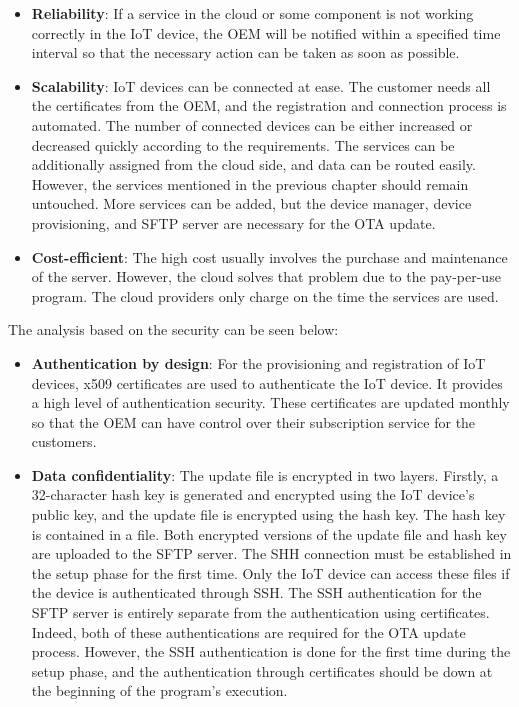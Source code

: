 \documentclass[12pt,a4paper]{article}
\begin{document}
{\begin{itemize}
\item \textbf{Reliability}: If a service in the cloud or some component is not working correctly in the IoT device, the OEM will be notified within a specified time interval so that the necessary action can be taken as soon as possible. 

\item \textbf{Scalability}: IoT devices can be connected at ease. The customer needs all the certificates from the OEM, and the registration and connection process is automated. The number of connected devices can be either increased or decreased quickly according to the requirements. The services can be additionally assigned from the cloud side, and data can be routed easily. However, the services mentioned in the previous chapter should remain untouched. More services can be added, but the device manager, device provisioning, and SFTP server are necessary for the OTA update.

\item \textbf{Cost-efficient}: The high cost usually involves the purchase and maintenance of the server. However, the cloud solves that problem due to the pay-per-use program. The cloud providers only charge on the time the services are used.

\end{itemize}

The analysis based on the security can be seen below:

\begin{itemize}

\item \textbf{Authentication by design}: For the provisioning and registration of IoT devices, x509 certificates are used to authenticate the IoT device. It provides a high level of authentication security. These certificates are updated monthly so that the OEM can have control over their subscription service for the customers.

\item \textbf{Data confidentiality}: The update file is encrypted in two layers. Firstly, a 32-character hash key is generated and encrypted using the IoT device's public key, and the update file is encrypted using the hash key. The hash key is contained in a file. Both encrypted versions of the update file and hash key are uploaded to the SFTP server. The SHH connection must be established in the setup phase for the first time. Only the IoT device can access these files if the device is authenticated through SSH. The SSH authentication for the SFTP server is entirely separate from the authentication using certificates. Indeed, both of these authentications are required for the OTA update process. However, the SSH authentication is done for the first time during the setup phase, and the authentication through certificates should be down at the beginning of the program's execution.


\end{itemize}}
\end{document}
